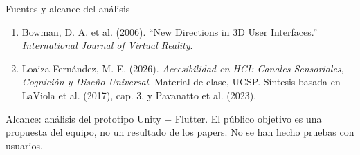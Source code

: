 \documentclass[aspectratio=169,11pt]{beamer}
\newcommand{\smallnote}[1]{{\color{Muted}\scriptsize #1}}
\begin{document}
\begin{frame}{Fuentes y alcance del análisis}
  \small
  \begin{enumerate}
    \item Bowman, D. A. et al. (2006). “New Directions in 3D User Interfaces.” \textit{International Journal of Virtual Reality}.
    \vspace{.4em}
    \item Loaiza Fernández, M. E. (2026). \textit{Accesibilidad en HCI: Canales Sensoriales, Cognición y Diseño Universal}. Material de clase, UCSP. Síntesis basada en LaViola et al. (2017), cap. 3, y Pavanatto et al. (2023).
  \end{enumerate}
  \vspace{.5em}
  \smallnote{Alcance: análisis del prototipo Unity + Flutter. El público objetivo es una propuesta del equipo, no un resultado de los papers. No se han hecho pruebas con usuarios.}
\end{frame}
\end{document}
